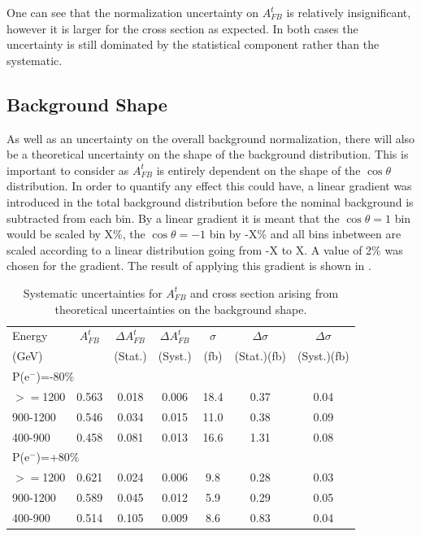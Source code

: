 One can see that the normalization uncertainty on $A_{FB}^t$ is relatively insignificant, however it is larger for the cross section as expected. In both cases the uncertainty is still dominated by the statistical component rather than the systematic.

\subsection{Background Shape}

As well as an uncertainty on the overall background normalization, there will also be a theoretical uncertainty on the shape of the background distribution. This is important to consider as $A_{FB}^t$ is entirely dependent on the shape of the $\cos\theta$ distribution. In order to quantify any effect this could have, a linear gradient was introduced in the total background distribution before the nominal background is subtracted from each bin. By a linear gradient it is meant that the $\cos\theta=1$ bin would be scaled by X\%, the $\cos\theta=-1$ bin by -X\% and all bins inbetween are scaled according to a linear distribution going from -X to X. A value of 2\% was chosen for the gradient. The result of applying this gradient is shown in .

\begin{table}
  \centering
  \begin{tabular}{l|c|c|c|c|c|c}
    \toprule
     Energy & $A_{FB}^t$ & $\Delta A_{FB}^t$  & $\Delta A^t_{FB}$ &  $\sigma$  &  $\Delta\sigma$  &  $\Delta\sigma$ \\
     (GeV) &  & (Stat.) & (Syst.) &  (fb) &  (Stat.)(fb) &  (Syst.)(fb)\\
     \midrule
     \midrule
     \multicolumn{7}{l}{P(e$^-$)=-80\%} \\
     \midrule
     \midrule
    $>=$1200   & 0.563 & 0.018 & 0.006 & 18.4 & 0.37 & 0.04\\
    \midrule
    900-1200   & 0.546 & 0.034 & 0.015 & 11.0 & 0.38 & 0.09\\
    \midrule
    400-900    & 0.458 & 0.081 & 0.013 & 16.6 & 1.31 & 0.08\\
    \midrule
    \midrule
   \multicolumn{7}{l}{ P(e$^-$)=+80\%}\\
    \midrule
    \midrule
    $>=$1200  & 0.621 & 0.024 & 0.006 & 9.8 & 0.28 & 0.03 \\
    \midrule
    900-1200  & 0.589 & 0.045 & 0.012 & 5.9 & 0.29 & 0.05 \\
    \midrule
    400-900   & 0.514 & 0.105 & 0.009 & 8.6 & 0.83 & 0.04 \\
    \bottomrule
  \end{tabular}
  \caption{Systematic uncertainties for $A_{FB}^t$ and cross section arising from theoretical uncertainties on the background shape.}
  \label{tab:bkggrad}
\end{table}

